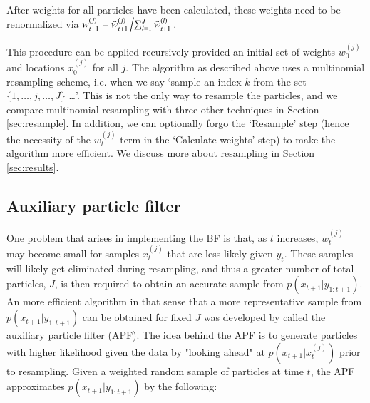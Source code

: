 \documentclass{elsarticle}
\begin{document}
\noindent After weights for all particles have been calculated, these weights need to be renormalized via $w_{t+1}^{(j)} = \tilde{w}_{t+1}^{(j)}\left/ \sum_{l=1}^J \tilde{w}_{t+1}^{(l)} \right.$.

This procedure can be applied recursively provided an initial set of weights $w_0^{(j)}$ and locations $x_0^{(j)}$ for all $j$. The algorithm as described above uses a multinomial resampling scheme, i.e. when we say `sample an index $k$ from the set $\{1,\ldots,j,\ldots,J\}$ \ldots'. This is not the only way to resample the particles, and we compare multinomial resampling with three other techniques in Section \ref{sec:resample}. In addition, we can optionally forgo the `Resample' step (hence the necessity of the $w_t^{(j)}$ term in the `Calculate weights' step) to make the algorithm more efficient. We discuss more about resampling in Section \ref{sec:results}.

\subsection{Auxiliary particle filter \label{sec:apf}}

One problem that arises in implementing the BF is that, as $t$ increases, $w_t^{(j)}$ may become small for samples $x_t^{(j)}$ that are less likely given $y_t$. These samples will likely get eliminated during resampling, and thus a greater number of total particles, $J$, is then required to obtain an accurate sample from $p(x_{t+1}|y_{1:t+1})$. An more efficient algorithm in that sense that a more representative sample from $p(x_{t+1}|y_{1:t+1})$ can be obtained for fixed $J$ was developed by \citet{Pitt:Shep:filt:1999} called the auxiliary particle filter (APF). The idea behind the APF is to generate particles with higher likelihood given the data by "looking ahead" at $p(x_{t+1}|x_t^{(j)})$ prior to resampling. Given a weighted random sample of particles at time $t$, the APF approximates $p(x_{t+1}|y_{1:t+1})$ by the following:
\end{document}
